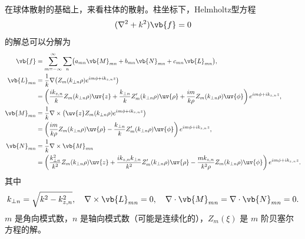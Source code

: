 在球体散射的基础上，来看柱体的散射。柱坐标下，Helmholtz型方程
\begin{equation*}
	(\nabla^2 + k^2)\vb{f} = 0
\end{equation*}
的解总可以分解为
\begin{align*}
	\vb{f}      & = \sum_{m=-\infty}^{\infty} \sum_n \bigl(a_{mn}\vb{M}_{mn} + b_{mn}\vb{N}_{mn} + c_{mn}\vb{L}_{mn}\bigr),                                                                                                                     \\
	\vb{L}_{mn} & = \frac{1}{k} \nabla \bigl(Z_m(k_{\perp n} \rho) e^{im\phi + ik_{z,n}z}\bigr)                                                                                                                                                 \\
	            & = \left( \frac{ik_{z,n}}{k} Z_m(k_{\perp n} \rho) \uv{z} + \frac{k_{\perp n}}{k} Z_m'(k_{\perp n} \rho) \uv{\rho} + \frac{im}{k\rho} Z_m(k_{\perp n} \rho) \uv{\phi} \right) e^{im\phi + ik_{z,n}z},                          \\
	\vb{M}_{mn} & = \frac{1}{k} \nabla \times \bigl(\uv{z} Z_m(k_{\perp n} \rho) e^{im\phi + ik_{z,n}z}\bigr)                                                                                                                                   \\
	            & = \left( \frac{im}{k\rho} Z_m(k_{\perp n} \rho) \uv{\rho} - \frac{k_{\perp n}}{k} Z_m'(k_{\perp n} \rho) \uv{\phi} \right) e^{im\phi + ik_{z,n}z},                                                                            \\
	\vb{N}_{mn} & = \frac{1}{k} \nabla \times \vb{M}_{mn}                                                                                                                                                                                       \\
	            & = \left( \frac{k_{\perp n}^2}{k^2} Z_m(k_{\perp n} \rho) \uv{z} + \frac{ik_{z,n}k_{\perp n}}{k^2} Z_m'(k_{\perp n} \rho) \uv{\rho} - \frac{mk_{z,n}}{k^2\rho} Z_m(k_{\perp n} \rho) \uv{\phi} \right) e^{im\phi + ik_{z,n}z}.
\end{align*}
其中
\begin{equation*}
	k_{\perp n} = \sqrt{k^2 - k_{z,n}^2}, \quad
	\nabla \times \vb{L}_{mn} = 0, \quad
	\nabla \cdot \vb{M}_{mn} = \nabla \cdot \vb{N}_{mn} = 0.
\end{equation*}
\(m\) 是角向模式数，\(n\) 是轴向模式数（可能是连续化的），\(Z_m(\xi)\) 是 \(m\) 阶贝塞尔方程的解。

